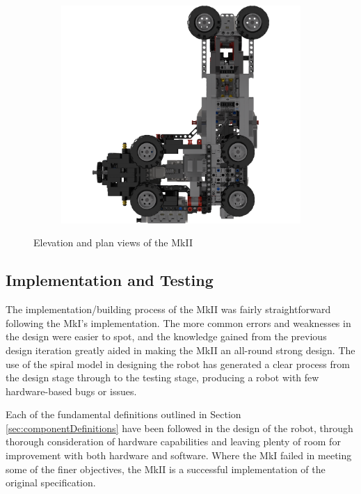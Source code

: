 \documentclass{report}
\begin{document}
\begin{figure}[H]
\begin{subfigure}[b]{0.275\textwidth}
    		\caption{}
    		\label{fig:rdrMkIIElevation5}
    	\end{subfigure}
		\hspace{10mm}
		\begin{subfigure}[b]{0.275\textwidth}
			\includegraphics[width=\textwidth]{Resources/Images/rdrMkIIElevation6.png}
			\caption{}
			\label{fig:rdrMkIIElevation6}
		\end{subfigure}
    	\caption{Elevation and plan views of the MkII}
    	\label{fig:rdrMkIIElevations}
    \end{figure}

    \subsection{Implementation and Testing}
    
	The implementation/building process of the MkII was fairly straightforward following the MkI's implementation. The more common errors and weaknesses in the design were easier to spot, and the knowledge gained from the previous design iteration greatly aided in making the MkII an all-round strong design. The use of the spiral model in designing the robot has generated a clear process from the design stage through to the testing stage, producing a robot with few hardware-based bugs or issues.
	
	Each of the fundamental definitions outlined in Section \ref{sec:componentDefinitions} have been followed in the design of the robot, through thorough consideration of hardware capabilities and leaving plenty of room for improvement with both hardware and software. Where the MkI failed in meeting some of the finer objectives, the MkII is a successful implementation of the original specification.
    
\end{document}
